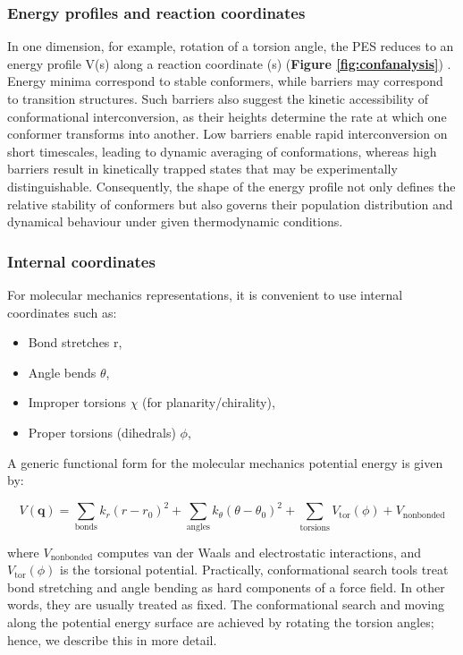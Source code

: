 \documentclass[12pt]{article}
\begin{document}
\subsubsection{Energy profiles and reaction coordinates}

In one dimension, for example, rotation of a torsion angle, the PES reduces to an energy profile V(s) along a reaction coordinate (s) (\textbf{Figure \ref{fig:confanalysis}}) . Energy minima correspond to stable conformers, while barriers may correspond to transition structures. Such barriers also suggest the kinetic accessibility of conformational interconversion, as their heights determine the rate at which one conformer transforms into another. Low barriers enable rapid interconversion on short timescales, leading to dynamic averaging of conformations, whereas high barriers result in kinetically trapped states that may be experimentally distinguishable. Consequently, the shape of the energy profile not only defines the relative stability of conformers but also governs their population distribution and dynamical behaviour under given thermodynamic conditions\cite{CH2_wales2015perspective}.

\subsubsection{Internal coordinates}

For molecular mechanics representations, it is convenient to use internal coordinates such as:
\begin{itemize}
\item Bond stretches r,
\item Angle bends $\theta$,
\item Improper torsions $\chi$ (for planarity/chirality),
\item Proper torsions (dihedrals) $\phi$,
\end{itemize}

A generic functional form for the molecular mechanics potential energy is given by:

\begin{equation}
    V(\mathbf{q}) =
    \sum_\text{bonds} k_r (r - r_0)^2 +
    \sum_\text{angles} k_\theta (\theta - \theta_0)^2 +
    \sum_\text{torsions} V_\text{tor}(\phi) +
    V_\text{nonbonded}
    \label{eq:PES_MOL}
\end{equation}

where $V_\text{nonbonded}$ computes van der Waals and electrostatic interactions, and $V_\text{tor}(\phi)$ is the torsional potential. Practically, conformational search tools treat bond stretching and angle bending as hard components of a force field. In other words, they are usually treated as fixed. The conformational search and moving along the potential energy surface are achieved by rotating the torsion angles; hence, we describe this in more detail.
\end{document}
